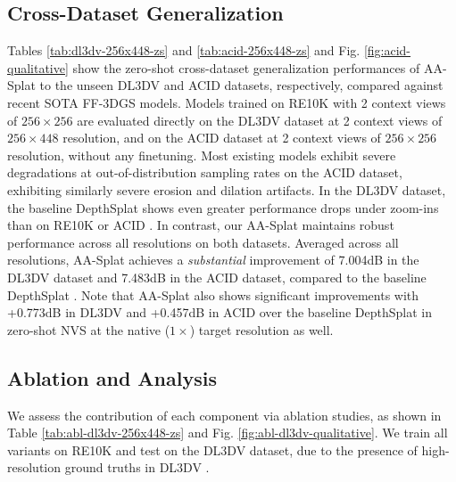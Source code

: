 \documentclass[runningheads]{llncs}
\begin{document}
\begin{table}
{\begin{tabular}{@{}l|cccccc|cccccc|cccccc@{}}
        \bottomrule
      \end{tabular}
  }
\end{table}

\subsection{Cross-Dataset Generalization}
\noindent Tables \ref{tab:dl3dv-256x448-zs} and \ref{tab:acid-256x448-zs} and Fig. \ref{fig:acid-qualitative} show the zero-shot cross-dataset generalization performances of AA-Splat to the unseen DL3DV \cite{ling2024dl3dv} and ACID \cite{liu2021infinite} datasets, respectively, compared against recent SOTA FF-3DGS models. Models trained on RE10K \cite{zhou2018stereo} with 2 context views of $256\times256$ are evaluated directly on the DL3DV \cite{ling2024dl3dv} dataset at 2 context views of $256\times448$ resolution, and on the ACID \cite{liu2021infinite} dataset at 2 context views of $256\times256$ resolution, without any finetuning. Most existing models exhibit severe degradations at out-of-distribution sampling rates on the ACID \cite{liu2021infinite} dataset, exhibiting similarly severe erosion and dilation artifacts. In the DL3DV \cite{ling2024dl3dv} dataset, the baseline DepthSplat shows even greater performance drops under zoom-ins than on RE10K \cite{zhou2018stereo} or ACID \cite{liu2021infinite}. In contrast, our AA-Splat maintains robust performance across all resolutions on both datasets. Averaged across all resolutions, AA-Splat achieves a \textit{substantial} improvement of 7.004dB in the DL3DV \cite{ling2024dl3dv} dataset and 7.483dB in the ACID \cite{liu2021infinite} dataset, compared to the baseline DepthSplat \cite{xu2025depthsplat}.
Note that AA-Splat also shows significant improvements with +0.773dB in DL3DV \cite{ling2024dl3dv} and +0.457dB in ACID \cite{liu2021infinite} over the baseline DepthSplat \cite{xu2025depthsplat} in zero-shot NVS at the native ($1\times$) target resolution as well.


\subsection{Ablation and Analysis}

We assess the contribution of each component via ablation studies, as shown in Table \ref{tab:abl-dl3dv-256x448-zs} and Fig. \ref{fig:abl-dl3dv-qualitative}. We train all variants on RE10K \cite{zhou2018stereo} and test on the DL3DV \cite{ling2024dl3dv} dataset, due to the presence of high-resolution ground truths in DL3DV \cite{ling2024dl3dv}.
\end{document}
